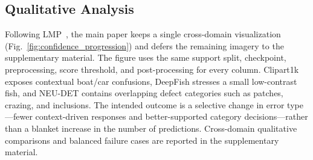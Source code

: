 \subsection{Qualitative Analysis}
\label{sec:qualitative}

Following LMP~\cite{lmp}, the main paper keeps a single cross-domain
visualization (Fig.~\ref{fig:confidence_progression}) and defers the remaining
imagery to the supplementary material. The figure uses the same support split,
checkpoint, preprocessing, score threshold, and post-processing for every
column. Clipart1k exposes contextual boat/car confusions, DeepFish stresses a
small low-contrast fish, and NEU-DET contains overlapping defect categories
such as patches, crazing, and inclusions. The intended outcome is a selective
change in error type---fewer context-driven responses and better-supported
category decisions---rather than a blanket increase in the number of
predictions. Cross-domain qualitative comparisons and balanced failure cases
are reported in the supplementary material.

